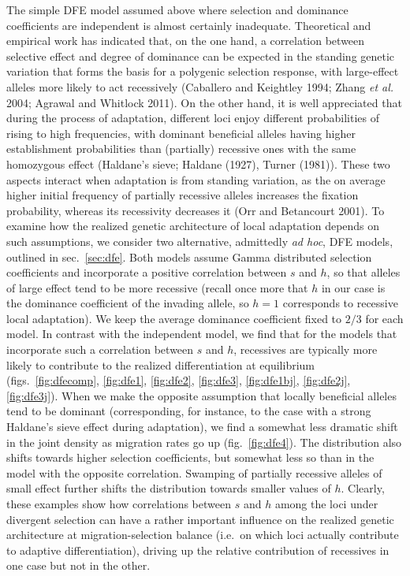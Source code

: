 \documentclass[
  11pt,
]{article}
\begin{document}
The simple DFE model assumed above where selection and dominance
coefficients are independent is almost certainly inadequate. Theoretical
and empirical work has indicated that, on the one hand, a correlation
between selective effect and degree of dominance can be expected in the
standing genetic variation that forms the basis for a polygenic
selection response, with large-effect alleles more likely to act
recessively (Caballero and Keightley 1994; Zhang \emph{et al.} 2004;
Agrawal and Whitlock 2011). On the other hand, it is well appreciated
that during the process of adaptation, different loci enjoy different
probabilities of rising to high frequencies, with dominant beneficial
alleles having higher establishment probabilities than (partially)
recessive ones with the same homozygous effect (Haldane's sieve; Haldane
(1927), Turner (1981)). These two aspects interact when adaptation is
from standing variation, as the on average higher initial frequency of
partially recessive alleles increases the fixation probability, whereas
its recessivity decreases it (Orr and Betancourt 2001). To examine how
the realized genetic architecture of local adaptation depends on such
assumptions, we consider two alternative, admittedly \emph{ad hoc}, DFE
models, outlined in sec.~\ref{sec:dfe}. Both models assume Gamma
distributed selection coefficients and incorporate a positive
correlation between \(s\) and \(h\), so that alleles of large effect
tend to be more recessive (recall once more that \(h\) in our case is
the dominance coefficient of the invading allele, so \(h=1\) corresponds
to recessive local adaptation). We keep the average dominance
coefficient fixed to \(2/3\) for each model. In contrast with the
independent model, we find that for the models that incorporate such a
correlation between \(s\) and \(h\), recessives are typically more
likely to contribute to the realized differentiation at equilibrium
(figs.~\ref{fig:dfecomp}, \ref{fig:dfe1}, \ref{fig:dfe2}, \ref{fig:dfe3}, \ref{fig:dfe1bj}, \ref{fig:dfe2j}, \ref{fig:dfe3j}).
When we make the opposite assumption that locally beneficial alleles
tend to be dominant (corresponding, for instance, to the case with a
strong Haldane's sieve effect during adaptation), we find a somewhat
less dramatic shift in the joint density as migration rates go up
(fig.~\ref{fig:dfe4}). The distribution also shifts towards higher
selection coefficients, but somewhat less so than in the model with the
opposite correlation. Swamping of partially recessive alleles of small
effect further shifts the distribution towards smaller values of \(h\).
Clearly, these examples show how correlations between \(s\) and \(h\)
among the loci under divergent selection can have a rather important
influence on the realized genetic architecture at migration-selection
balance (i.e.~on which loci actually contribute to adaptive
differentiation), driving up the relative contribution of recessives in
one case but not in the other.
\end{document}
